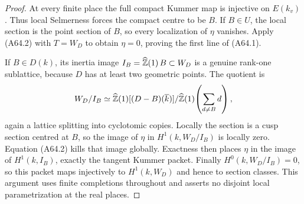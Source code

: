 \begin{proof}
At every finite place the full compact Kummer map is injective
on $E(k_v)$. Thus local Selmerness forces the compact centre
to be $B$. If $B\in U$, the local section is the point section
of $B$, so every localization of $\eta$ vanishes. Apply
(A64.2) with $T=W_D$ to obtain $\eta=0$, proving the first
line of (A64.1).

If $B\in D(k)$, its inertia image
$I_B=\widehat{\mathbb Z}(1)\,B\subset W_D$ is a genuine rank-one
sublattice, because $D$ has at least two geometric points.
The quotient is
\[
 W_D/I_B\simeq
 \widehat{\mathbb Z}(1)[(D-B)(\overline k)]/
       \widehat{\mathbb Z}(1)\!\left(\sum_{d\ne B}d\right),
\]
again a lattice splitting into cyclotomic copies. Locally the
section is a cusp section centred at $B$, so the image of
$\eta$ in $H^1(k,W_D/I_B)$ is locally zero. Equation (A64.2)
kills that image globally. Exactness then places $\eta$ in the
image of $H^1(k,I_B)$, exactly the tangent Kummer packet.
Finally $H^0(k,W_D/I_B)=0$, so this packet maps injectively
to $H^1(k,W_D)$ and hence to section classes. This argument
uses finite completions throughout and asserts no disjoint
local parametrization at the real places.
\end{proof}
